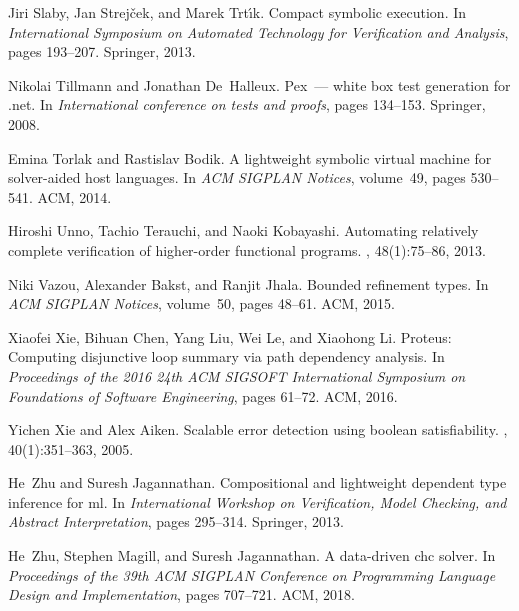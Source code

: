 \begin{thebibliography}{10}
Jiri Slaby, Jan Strej{\v{c}}ek, and Marek Trt{\'\i}k.
\newblock Compact symbolic execution.
\newblock In {\em International Symposium on Automated Technology for
  Verification and Analysis}, pages 193--207. Springer, 2013.

Nikolai Tillmann and Jonathan De~Halleux.
\newblock Pex~--- white box test generation for .net.
\newblock In {\em International conference on tests and proofs}, pages
  134--153. Springer, 2008.

Emina Torlak and Rastislav Bodik.
\newblock A lightweight symbolic virtual machine for solver-aided host
  languages.
\newblock In {\em ACM SIGPLAN Notices}, volume~49, pages 530--541. ACM, 2014.

Hiroshi Unno, Tachio Terauchi, and Naoki Kobayashi.
\newblock Automating relatively complete verification of higher-order
  functional programs.
, 48(1):75--86, 2013.

Niki Vazou, Alexander Bakst, and Ranjit Jhala.
\newblock Bounded refinement types.
\newblock In {\em ACM SIGPLAN Notices}, volume~50, pages 48--61. ACM, 2015.

Xiaofei Xie, Bihuan Chen, Yang Liu, Wei Le, and Xiaohong Li.
\newblock Proteus: Computing disjunctive loop summary via path dependency
  analysis.
\newblock In {\em Proceedings of the 2016 24th ACM SIGSOFT International
  Symposium on Foundations of Software Engineering}, pages 61--72. ACM, 2016.

Yichen Xie and Alex Aiken.
\newblock Scalable error detection using boolean satisfiability.
, 40(1):351--363, 2005.

He~Zhu and Suresh Jagannathan.
\newblock Compositional and lightweight dependent type inference for ml.
\newblock In {\em International Workshop on Verification, Model Checking, and
  Abstract Interpretation}, pages 295--314. Springer, 2013.

He~Zhu, Stephen Magill, and Suresh Jagannathan.
\newblock A data-driven chc solver.
\newblock In {\em Proceedings of the 39th ACM SIGPLAN Conference on Programming
  Language Design and Implementation}, pages 707--721. ACM, 2018.

\end{thebibliography}

